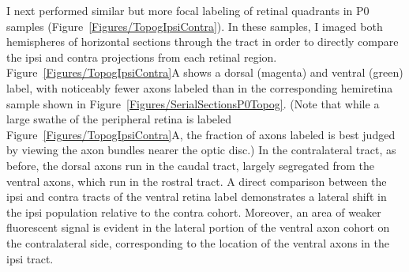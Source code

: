 I next performed similar but more focal labeling of retinal quadrants in P0 samples (Figure~\ref{Figures/TopogIpsiContra}).
In these samples, I imaged both hemispheres of horizontal sections through the tract in order to directly compare the ipsi and contra projections from each retinal region.
Figure~\ref{Figures/TopogIpsiContra}A shows a dorsal (magenta) and ventral (green) label, with noticeably fewer axons labeled than in the corresponding hemiretina sample shown in Figure~\ref{Figures/SerialSectionsP0Topog}.
(Note that while a large swathe of the peripheral retina is labeled Figure~\ref{Figures/TopogIpsiContra}A, the fraction of axons labeled is best judged by viewing the axon bundles nearer the optic disc.)
In the contralateral tract, as before, the dorsal axons run in the caudal tract, largely segregated from the ventral axons, which run in the rostral tract.
A direct comparison between the ipsi and contra tracts of the ventral retina label demonstrates a lateral shift in the ipsi population relative to the contra cohort.
Moreover, an area of weaker fluorescent signal is evident in the lateral portion of the ventral axon cohort on the contralateral side, corresponding to the location of the ventral axons in the ipsi tract.
